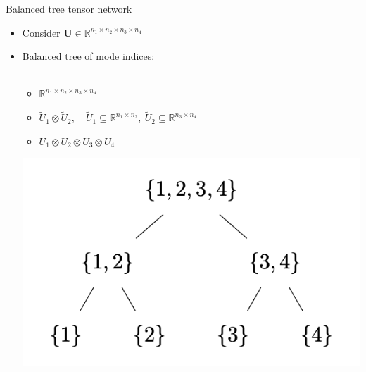 \documentclass{beamer}
\newcommand{\bvec}[1]{\mathbf{#1}}
\newcommand{\vU}{\bvec{U}}
\newcommand{\bitem}{\item[$\bullet$]}
\begin{document}
\begin{frame}{Balanced tree tensor network}

\begin{itemize}
    \bitem Consider $\vU \in \mathbb{R}^{n_1\times n_2\times n_3 \times n_4}$
    \bitem Balanced tree of mode indices:\\
    ~\\
    \begin{minipage}{7cm}
    \begin{itemize}
        \item[] $\mathbb{R}^{n_1\times n_2 \times n_3 \times n_4}$
        \vspace{3mm}
        \item[] $\tilde U_1\otimes \tilde U_2,\quad \tilde U_1\subseteq \mathbb{R}^{n_1 \times n_2},~\tilde U_2\subseteq \mathbb{R}^{n_3 \times n_4}$  \vspace{5mm}
        \item[] $U_1\otimes U_2 \otimes U_3 \otimes U_4$ \vspace{4mm}
    \end{itemize}
    \end{minipage}
    \begin{minipage}{4cm}
    \includegraphics[width = 1.2\textwidth]{Graphics/Balanced_tree.png}
    \end{minipage}
\end{itemize}

\end{frame}
\end{document}

